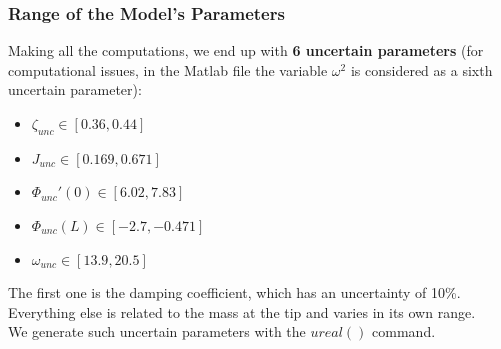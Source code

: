 \documentclass[a4paper, 12pt]{article}
\begin{document}
\subsubsection{Range of the Model's Parameters}
Making all the computations, we end up with \textbf{6 uncertain parameters} (for computational issues, in the Matlab file the variable $\omega^2$ is considered as a sixth uncertain parameter):\\
\begin{itemize}
    \item $\zeta_{unc} \in [0.36, 0.44]$ 
    \item $J_{unc} \in [0.169,0.671]$
    \item $\Phi_{unc}'(0) \in [6.02,7.83]$
    \item $\Phi_{unc}(L) \in [-2.7,-0.471]$
    \item $\omega_{unc} \in [13.9,20.5]$
\end{itemize}
The first one is the damping coefficient, which has an uncertainty of 10\%. Everything else is related to the mass at the tip and varies in its own range.\\  
We generate such uncertain parameters with the $ureal()$ command. 
\end{document}

